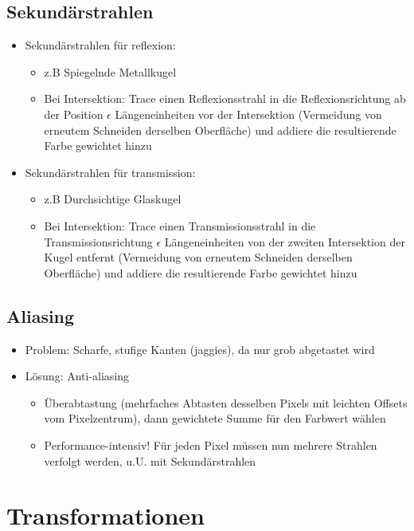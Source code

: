 \documentclass[10pt,a4paper]{article}
\begin{document}
	\subsection{Sekundärstrahlen}
	\begin{itemize}
		\item Sekundärstrahlen für \Gls{reflexion}:
			\begin{itemize}
				\item z.B Spiegelnde Metallkugel
				\item Bei Intersektion: Trace einen Reflexionsstrahl in die Reflexionsrichtung ab der Position $\epsilon$ Längeneinheiten vor der Intersektion (Vermeidung von erneutem Schneiden derselben Oberfläche) und addiere die resultierende Farbe gewichtet hinzu
			\end{itemize}
		\item Sekundärstrahlen für \Gls{transmission}:
			\begin{itemize}
				\item z.B Durchsichtige Glaskugel
				\item Bei Intersektion: Trace einen Transmissionsstrahl in die Transmissionsrichtung $\epsilon$ Längeneinheiten von der zweiten Intersektion der Kugel entfernt (Vermeidung von erneutem Schneiden derselben Oberfläche) und addiere die resultierende Farbe gewichtet hinzu
			\end{itemize}
	\end{itemize}

	\subsection{Aliasing}
	\begin{itemize}
		\item Problem: Scharfe, stufige Kanten (\glqq jaggies\grqq), da nur grob abgetastet wird
		\item Lösung: Anti-\Gls{aliasing}
		\begin{itemize}
			\item Überabtastung (mehrfaches Abtasten desselben Pixels mit leichten Offsets vom Pixelzentrum), dann gewichtete Summe für den Farbwert wählen
			\item Performance-intensiv! Für jeden Pixel müssen nun mehrere Strahlen verfolgt werden, u.U. mit Sekundärstrahlen
		\end{itemize}
	\end{itemize}

	\newpage
	\section{Transformationen}
\end{document}
